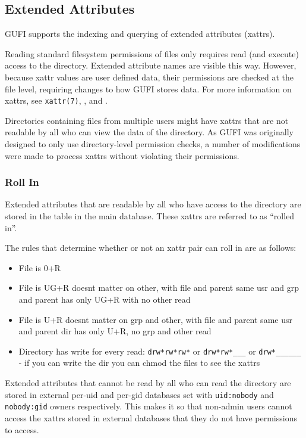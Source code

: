 \subsection{Extended Attributes}
\label{sec:xattrs}
GUFI supports the indexing and querying of extended attributes
(xattrs).

Reading standard filesystem permissions of files only requires read
(and execute) access to the directory. Extended attribute names are
visible this way. However, because xattr values are user defined data,
their permissions are checked at the file level, requiring changes to
how GUFI stores data. For more information on xattrs, see
\texttt{xattr(7)}, \listxattr, and \getxattr.

Directories containing files from multiple users might have xattrs
that are not readable by all who can view the \lstat data of the
directory. As GUFI was originally designed to only use directory-level
permission checks, a number of modifications were made to process
xattrs without violating their permissions.

\subsubsection{Roll In}
Extended attributes that are readable by all who have access to the
directory are stored in the \xattrspwd table in the main
database. These xattrs are referred to as ``rolled in''.

The rules that determine whether or not an xattr pair can roll in are
as follows:

\begin{itemize}
\item File is 0+R
\item File is UG+R doesnt matter on other, with file and parent same
  usr and grp and parent has only UG+R with no other read
\item File is U+R doesnt matter on grp and other, with file and parent
  same usr and parent dir has only U+R, no grp and other read
\item Directory has write for every read:
    \texttt{drw*rw*rw*} or \texttt{drw*rw*\_\_\_} or
    \texttt{drw*\_\_\_\_\_\_} - if you can write the dir you can
    chmod the files to see the xattrs
\end{itemize}

Extended attributes that cannot be read by all who can read the
directory are stored in external per-uid and per-gid databases set
with \texttt{uid:nobody} and \texttt{nobody:gid} owners
respectively. This makes it so that non-admin users cannot access the
xattrs stored in external databases that they do not have permissions
to access.

